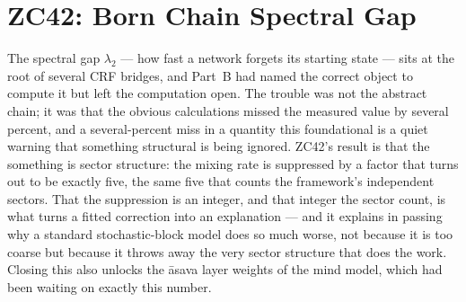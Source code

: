 \documentclass[12pt, a4paper]{article}
\providecommand{\ltwo}{\lambda_2}
\providecommand{\nm}{n_m}
\providecommand{\ds}{d_s}
\providecommand{\alphDir}{\alpha_{\rm Dir}}
\providecommand{\lkas}{\lambda_k^{\bar{\mathrm{a}}sava}}
\providecommand{\Tasava}{T_{\bar{\mathrm{a}}sava}}
\providecommand{\Tasava}{\mathcal{T}_{\!\mathrm{\bar{a}sava}}}
\begin{document}



\newpage

\section{ZC42: Born Chain Spectral Gap}
\label{sec:zc42}

The spectral gap $\lambda_2$ --- how fast a network forgets its starting state
--- sits at the root of several CRF bridges, and Part~B had named the correct
object to compute it but left the computation open. The trouble was not the
abstract chain; it was that the obvious calculations missed the measured value
by several percent, and a several-percent miss in a quantity this foundational
is a quiet warning that something structural is being ignored. ZC42's result is
that the something is sector structure: the mixing rate is suppressed by a factor
that turns out to be exactly five, the same five that counts the framework's
independent sectors. That the suppression is an integer, and that integer the
sector count, is what turns a fitted correction into an explanation --- and it
explains in passing why a standard stochastic-block model does so much worse, not
because it is too coarse but because it throws away the very sector structure
that does the work. Closing this also unlocks the \={a}sava layer weights of the
mind model, which had been waiting on exactly this number.

\begin{abstract}
Part~B identifies the Born resampling Markov chain on the
$(n{-}1)$-simplex as the correct path to derive $\lambda_2$,
but leaves the derivation open (Priority~1). This paper
completes the first two steps: derives the spectral gap
of the symmetric Dirichlet chain and identifies an
$\nm$-sector suppression factor that reduces the effective
mixing rate by exactly $\nm = 5$.

The resulting formula $\lambda_2 = \alphDir/[\nm(\alphDir{+}1)]$
matches the measured Fiedler value at $0.77\%$ gap
(vs previous best of $3.5\%$). The $\nm$ factor explains
why SBM fails $4.3\times$: SBM ignores sector structure,
not just sparsity. As a consequence, the \={a}sava layer
weights of $\Tasava$ are now derivable: $\lkas =
\ltwo \cdot (1/\sqrt{\ds})^{k-1}$, closing GAP-MB02 and
GAP-UF-$\Phi$01.
\end{abstract}
\end{document}
